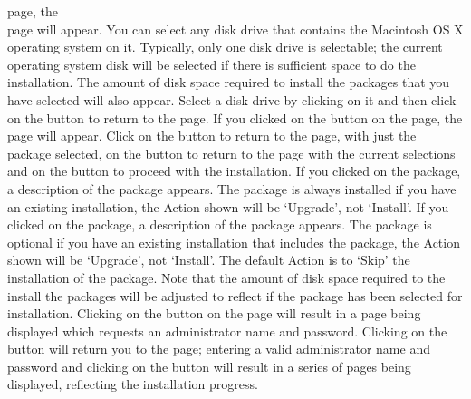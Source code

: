  page, the\\
 page will appear.
You can select any disk drive that contains the Macintosh OS X operating system on it.
Typically, only one disk drive is selectable; the current operating system disk will be
selected if there is sufficient space to do the installation.
The amount of disk space required to install the packages that you have selected will also
appear.
Select a disk drive by clicking on it and then click on the  button
to return to the  page.
\newpage
If you clicked on the  button on the 
page, the  page will appear.
Click on the  button to return to the
 page, with just the  package selected, on the
 button to return to the  page with the
current selections and on the  button to proceed with the
installation.
\newpage
If you clicked on the  package, a description of the package appears.
The  package is always installed \longDash{} if you have an existing
\mplusm{} installation, the Action shown will be `Upgrade', not `Install'.
\newpage
If you clicked on the  package, a description of the package appears.
The  package is optional \longDash{} if you have an existing \mplusm{}
installation that includes the  package, the Action shown will be
`Upgrade', not `Install'.
The default Action is to `Skip' the installation of the  package.
Note that the amount of disk space required to the install the packages will be adjusted
to reflect if the  package has been selected for installation.
\newpage
Clicking on the  button on the  page
will result in a page being displayed which requests an administrator name and password.
Clicking on the  button will return you to the
 page; entering a valid administrator name and password and
clicking on the  button will result in a series of pages
being displayed, reflecting the installation progress.
